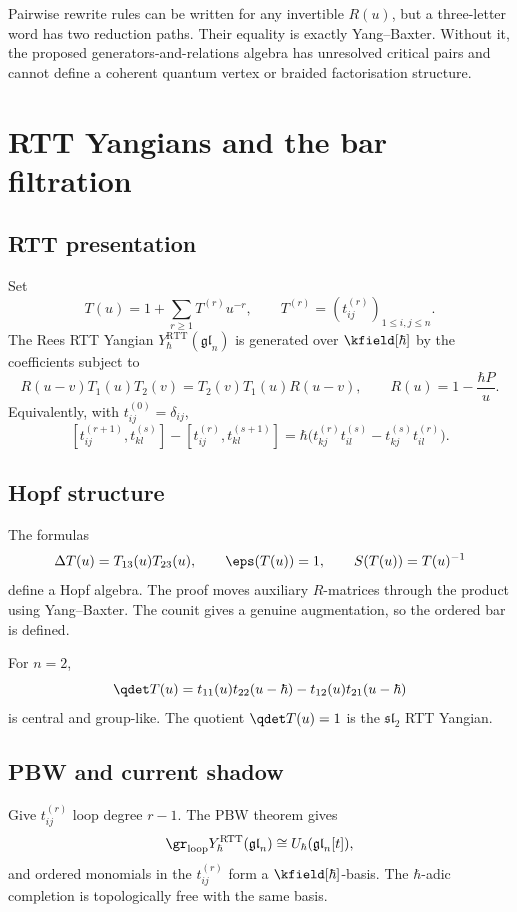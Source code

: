 \begin{nogobox}[title={No-go theorem 16: an exchange relation without Yang--Baxter has no coherent three-field algebra}]
Pairwise rewrite rules can be written for any invertible \(R(u)\), but a three-letter word has two reduction paths.  Their equality is exactly Yang--Baxter.  Without it, the proposed generators-and-relations algebra has unresolved critical pairs and cannot define a coherent quantum vertex or braided factorisation structure.
\end{nogobox}

\chapter{RTT Yangians and the bar filtration}\label{chap:yangian}

\section{RTT presentation}
Set
\[
 T(u)=1+\sum_{r\ge1}T^{(r)}u^{-r},
 \qquad T^{(r)}=(t_{ij}^{(r)})_{1\le i,j\le n}.
\]
The Rees RTT Yangian \(Y_\hbar^{\mathrm{RTT}}(\mathfrak{gl}_n)\) is generated over \(\kfield[\hbar]\) by the coefficients subject to
\[
 R(u-v)T_1(u)T_2(v)=T_2(v)T_1(u)R(u-v),
 \qquad R(u)=1-\frac{\hbar P}{u}.
\]
Equivalently, with \(t_{ij}^{(0)}=\delta_{ij}\),
\[
 [t_{ij}^{(r+1)},t_{kl}^{(s)}]-[t_{ij}^{(r)},t_{kl}^{(s+1)}]
 =\hbar\bigl(t_{kj}^{(r)}t_{il}^{(s)}-t_{kj}^{(s)}t_{il}^{(r)}\bigr).
\]

\section{Hopf structure}
The formulas
\[
 \Delta T(u)=T_{13}(u)T_{23}(u),
 \qquad \eps(T(u))=1,
 \qquad S(T(u))=T(u)^{-1}
\]
define a Hopf algebra.  The proof moves auxiliary \(R\)-matrices through the product using Yang--Baxter.  The counit gives a genuine augmentation, so the ordered bar is defined.

For \(n=2\),
\[
 \qdet T(u)=t_{11}(u)t_{22}(u-\hbar)-t_{12}(u)t_{21}(u-\hbar)
\]
is central and group-like.  The quotient \(\qdet T(u)=1\) is the \(\mathfrak{sl}_2\) RTT Yangian.

\section{PBW and current shadow}
Give \(t_{ij}^{(r)}\) loop degree \(r-1\).  The PBW theorem gives
\[
 \gr_{\mathrm{loop}}Y_\hbar^{\mathrm{RTT}}(\mathfrak{gl}_n)
 \cong U_\hbar(\mathfrak{gl}_n[t]),
\]
and ordered monomials in the \(t_{ij}^{(r)}\) form a \(\kfield[\hbar]\)-basis.  The \(\hbar\)-adic completion is topologically free with the same basis.

